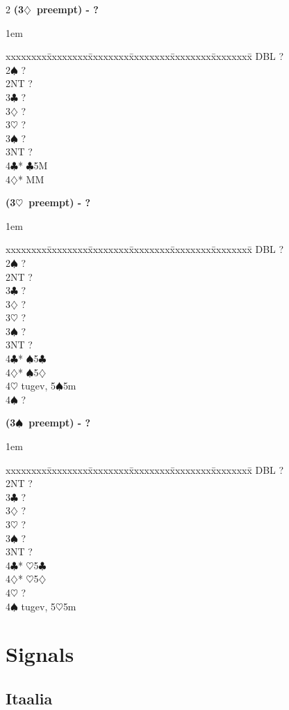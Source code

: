 \documentclass[10pt]{article}
\renewcommand{\c}{$\clubsuit$}
\renewcommand{\d}{$\diamondsuit$}
\newcommand{\h}{$\heartsuit$}
\newcommand{\s}{$\spadesuit$}
\newcommand{\x}{DBL}
\newenvironment{bidtable}[1][]
{\textbf{#1}
  \begin{adjustwidth}{1em}{}
    \addvspace{2pt}
    \begin{tabbing}
      xxxxxxxx\=xxxxxxxx\=xxxxxxxx\=xxxxxxxx\=xxxxxxxx\=xxxxxxxx\=\kill}
{\end{tabbing}\end{adjustwidth}\bigskip}%
\begin{document}
\begin{multicols*}{2}
\begin{bidtable}[(3\d\ preempt) - ?]
\x   \> ?      \\
2\s  \> ?      \\
2NT  \> ?      \\
3\c  \> ?      \\
3\d  \> ?      \\
3\h  \> ?      \\
3\s  \> ?      \\
3NT  \> ?      \\
4\c* {}\c 5M \\
4\d* {} MM
\end{bidtable}

\begin{bidtable}[(3\h\ preempt) - ?]
\x   \> ?       \\
2\s  \> ?       \\
2NT  \> ?       \\
3\c  \> ?       \\
3\d  \> ?       \\
3\h  \> ?       \\
3\s  \> ?       \\
3NT  \> ?       \\
4\c* {}\s 5\c \\
4\d* {}\s 5\d \\
4\h \> tugev, 5\s 5m \\
4\s \> ? \\
\end{bidtable}

\begin{bidtable}[(3\s\ preempt) - ?]
\x   \> ?       \\
2NT  \> ?       \\
3\c  \> ?       \\
3\d  \> ?       \\
3\h  \> ?       \\
3\s  \> ?       \\
3NT  \> ?       \\
4\c* {}\h 5\c \\
4\d* {}\h 5\d \\
4\h  \> ?       \\
4\s  \> tugev, 5\h 5m
\end{bidtable}

\newpage
\section{Signals}
\subsection{Itaalia}


\end{multicols*}
\end{document}

